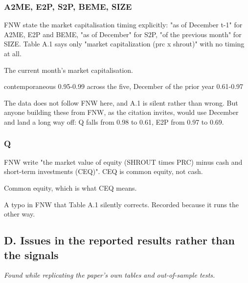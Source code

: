 \documentclass[11pt]{article}
\begin{document}
\subsubsection*{A2ME, E2P, S2P, BEME, SIZE}
\begin{description}[leftmargin=2.4cm,labelwidth=2.2cm,font=\normalfont\bfseries,style=sameline]
\item[Documented:] FNW state the market capitalisation timing explicitly: "as of December t-1" for A2ME, E2P and BEME, "as of December" for S2P, "of the previous month" for SIZE. Table A.1 says only "market capitalization (prc x shrout)" with no timing at all.
\item[Implemented:] The current month's market capitalisation.
\item[Evidence:] contemporaneous 0.95-0.99 across the five, December of the prior year 0.61-0.97
\item[Why it matters:] The data does not follow FNW here, and A.1 is silent rather than wrong. But anyone building these from FNW, as the citation invites, would use December and land a long way off: Q falls from 0.98 to 0.61, E2P from 0.97 to 0.69.
\end{description}
\subsubsection*{Q}
\begin{description}[leftmargin=2.4cm,labelwidth=2.2cm,font=\normalfont\bfseries,style=sameline]
\item[Documented:] FNW write "the market value of equity (SHROUT times PRC) minus cash and short-term investments (CEQ)". CEQ is common equity, not cash.
\item[Implemented:] Common equity, which is what CEQ means.
\item[Why it matters:] A typo in FNW that Table A.1 silently corrects. Recorded because it runs the other way.
\end{description}
\subsection*{D. Issues in the reported results rather than the signals}
\emph{Found while replicating the paper's own tables and out-of-sample tests.}
\end{document}
